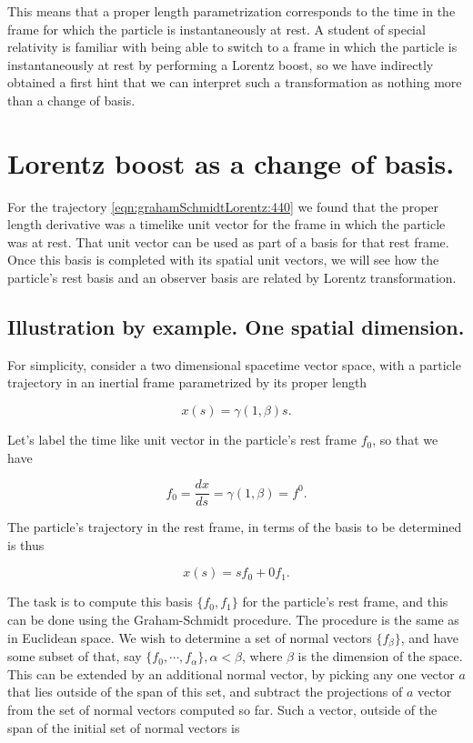\documentclass[iop,onecolumn]{emulateapj}
\begin{document}
This means that a proper length parametrization corresponds to the time in the frame for which the particle is instantaneously at rest.  A student of special relativity is familiar with being able to switch to a frame in which the particle is instantaneously at rest by performing a Lorentz boost, so we have indirectly obtained a first hint that we can interpret such a transformation as nothing more than a change of basis.

\section{Lorentz boost as a change of basis.}

For the trajectory \ref{eqn:grahamSchmidtLorentz:440} we found that the proper length derivative was a timelike unit vector for the frame in which the particle was at rest.  That unit vector can be used as part of a basis for that rest frame.  Once this basis is completed with its spatial unit vectors, we will see how the particle's rest basis and an observer basis are related by Lorentz transformation.

\subsection{Illustration by example.  One spatial dimension.}

For simplicity, consider a two dimensional spacetime vector space, with a particle trajectory in an inertial frame parametrized by its proper length

\begin{equation}\label{eqn:grahamSchmidtLorentz:600}
x(s) = \gamma (1, \beta) s.
\end{equation}

Let's label the time like unit vector in the particle's rest frame $f_0$, so that we have

\begin{equation}\label{eqn:grahamSchmidtLorentz:620}
f_0 = \frac{dx}{ds} = \gamma (1, \beta) = f^0.
\end{equation}

The particle's trajectory in the rest frame, in terms of the basis to be determined is thus

\begin{equation}\label{eqn:grahamSchmidtLorentz:640}
x(s) = s f_0 + 0 f_1.
\end{equation}

The task is to compute this basis $\{f_0, f_1\}$ for the particle's rest frame, and this can be done using the Graham-Schmidt procedure.  The procedure is the same as in Euclidean space.  We wish to determine a set of normal vectors $\{f_\beta\}$, and have some subset of that, say $\{f_0, \cdots, f_\alpha\}, \alpha < \beta$, where $\beta$ is the dimension of the space.  This can be extended by an additional normal vector, by picking any one vector $a$ that lies outside of the span of this set, and subtract the projections of $a$ vector from the set of normal vectors computed so far.  Such a vector, outside of the span of the initial set of normal vectors is
\end{document}

